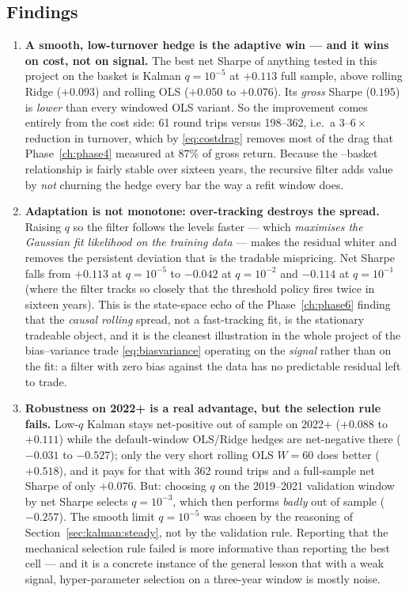 \subsection{Findings}

\begin{enumerate}[label=\textbf{K\arabic*.}]
  \item \textbf{A smooth, low-turnover hedge is the adaptive win --- and it wins on cost,
    not on signal.} The best net Sharpe of anything tested in this project on the
     basket is Kalman $q=10^{-5}$ at $+0.113$ full sample, above rolling Ridge
    ($+0.093$) and rolling OLS ($+0.050$ to $+0.076$). Its \emph{gross} Sharpe
    ($0.195$) is \emph{lower} than every windowed OLS variant. So the improvement comes
    entirely from the cost side: 61 round trips versus 198--362, i.e.\ a $3$--$6\times$
    reduction in turnover, which by \eqref{eq:costdrag} removes most of the drag that
    Phase~\ref{ch:phase4} measured at $87\%$ of gross return. Because the
    --basket relationship is fairly stable over sixteen years, the recursive
    filter adds value by \emph{not} churning the hedge every bar the way a refit window
    does.
  \item \textbf{Adaptation is not monotone: over-tracking destroys the spread.} Raising
    $q$ so the filter follows the levels faster --- which \emph{maximises the Gaussian fit
    likelihood on the training data} --- makes the residual whiter and removes the
    persistent deviation that is the tradable mispricing. Net Sharpe falls from $+0.113$ at
    $q=10^{-5}$ to $-0.042$ at $q=10^{-2}$ and $-0.114$ at $q=10^{-1}$ (where the filter
    tracks so closely that the threshold policy fires twice in sixteen years). This is the
    state-space echo of the Phase~\ref{ch:phase6} finding that the \emph{causal rolling}
    spread, not a fast-tracking fit, is the stationary tradeable object, and it is the
    cleanest illustration in the whole project of the bias--variance trade
    \eqref{eq:biasvariance} operating on the \emph{signal} rather than on the fit: a filter
    with zero bias against the data has no predictable residual left to trade.
  \item \textbf{Robustness on 2022+ is a real advantage, but the selection rule fails.}
    Low-$q$ Kalman stays net-positive out of sample on 2022+ ($+0.088$ to $+0.111$) while
    the default-window OLS/Ridge hedges are net-negative there ($-0.031$ to $-0.527$);
    only the very short rolling OLS $W{=}60$ does better ($+0.518$), and it pays for that
    with 362 round trips and a full-sample net Sharpe of only $+0.076$. But: choosing $q$
    on the 2019--2021 validation window by net Sharpe selects $q=10^{-3}$, which then
    performs \emph{badly} out of sample ($-0.257$). The smooth limit $q=10^{-5}$ was
    chosen by the reasoning of Section~\ref{sec:kalman:steady}, not by the validation rule.
    Reporting that the mechanical selection rule failed is more informative than reporting
    the best cell --- and it is a concrete instance of the general lesson that with a weak
    signal, hyper-parameter selection on a three-year window is mostly noise.
\end{enumerate}

